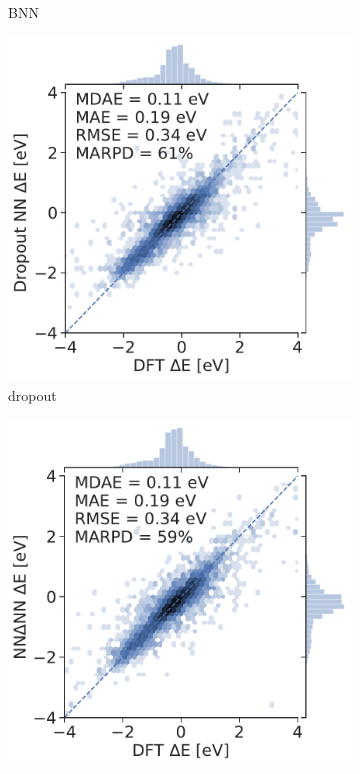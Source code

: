 \documentclass[]{achemso}
\begin{document}
\begin{figure}
\begin{subfigure}{0.32\textwidth}
        \caption{\gls{BNN}}\label{fig:parity_bnn}
    \end{subfigure}
    \begin{subfigure}{0.32\textwidth}
        \includegraphics[width=\textwidth]{../dropout/parity.pdf}
        \caption{\gls{dropout}}\label{fig:parity_dropout}
    \end{subfigure}
    \begin{subfigure}{0.32\textwidth}
        \includegraphics[width=\textwidth]{../NNdNN/parity.pdf}

\end{subfigure}
\end{figure}
\end{document}
